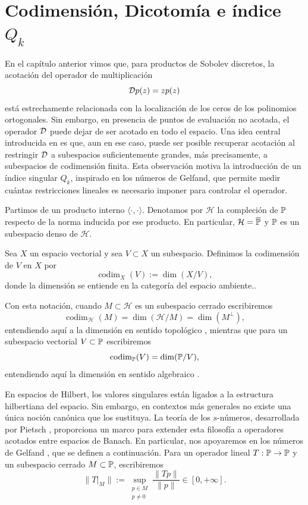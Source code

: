 \chapter{Codimensión, Dicotomía e índice \texorpdfstring{$Q_k$}{Qk}}\label{sec:codimension_qk}

En el capítulo anterior vimos que, para productos de Sobolev discretos, la
acotación del operador de multiplicación
\[
	\mathcal{D} p(z)=zp(z)
\]
está estrechamente relacionada con la localización de los ceros de los
polinomios ortogonales. Sin embargo, en presencia de puntos de evaluación no
acotada, el operador \(\mathcal{D}\) puede dejar de ser acotado en todo el espacio. Una
idea central introducida en \cite{EGS26} es que, aun en ese caso, puede ser
posible recuperar acotación al restringir \(\mathcal{D}\) a subespacios suficientemente
grandes, más precisamente, a subespacios de codimensión finita. Esta observación
motiva la introducción de un índice singular \(Q_k\), inspirado en los números
de Gelfand, que permite medir cuántas restricciones lineales es necesario
imponer para controlar el operador.

Partimos de un producto interno $\langle\cdot, \cdot\rangle$. Denotamos por $\mathcal H$ la compleción de $\mathbb{P}$ respecto de la norma inducida por ese producto. En particular, $\mathcal H=\overline{\mathbb{P}}$ y $\mathbb{P}$ es un subespacio denso de $\mathcal H$.

\begin{defn}\label{def:codim_general}
	Sea $X$ un espacio vectorial y sea $V\subset X$ un subespacio. Definimos la codimensión de $V$ en $X$ por
	\[
		\operatorname{codim}_{X}(V):=\dim(X/V),
	\]
	donde la dimensión se entiende en la categoría del espacio ambiente.\cite{hormander1989linearfunctionalanalysis}.
\end{defn}

Con esta notación, cuando $M\subset\mathcal H$ es un subespacio cerrado escribiremos
\[
	\operatorname{codim}_{\mathcal H}(M)=\dim(\mathcal H/M)=\dim(M^\perp),
\]
entendiendo aquí a la dimensión en sentido topológico \cite{halmos1982hilbert}, mientras que para un subespacio vectorial $V\subset\mathbb{P}$ escribiremos
\[
	\operatorname{codim}_{\mathbb{P}}(V)=\dim(\mathbb{P}/V),
\]
entendiendo aquí la dimensión en sentido algebraico \cite{Aizpuru2009Apuntes}.

En espacios de Hilbert, los valores singulares están ligados a la estructura hilbertiana del espacio. Sin embargo, en contextos más generales no existe una única noción canónica que los sustituya. La teoría de los \(s\)-números, desarrollada por Pietsch \cite{Ullrich2024, Pietsch1987}, proporciona un marco para extender esta filosofía a operadores acotados entre espacios de Banach. En particular, nos apoyaremos en los números de Gelfand \cite{Ullrich2024}, que se definen a continuación. Para un operador lineal $T:\mathbb{P}\to\mathbb{P}$ y un subespacio cerrado $M\subset\mathbb{P}$, escribiremos
\[
	\|T|_M\|:=\sup_{\substack{p\in M\\ p\ne0}}\frac{\|Tp\|}{\|p\|}\in[0,+\infty].
\]

